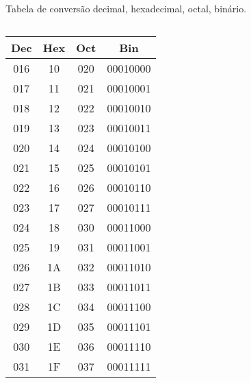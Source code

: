 \begin{frame}{Tabela de conversão decimal, hexadecimal, octal, binário.}
\begin{columns}
  \begin{column}{.5\textwidth}
    \begin{tabular}{cccc}\hline
      \bf Dec& \bf 	Hex &\bf	Oct &\bf	Bin\\\hline
      016&	10&	020&	00010000\\
      017&	11&	021&	00010001\\
      018&	12&	022&	00010010\\
      019&	13&	023&	00010011\\
      020&	14&	024&	00010100\\
      021&	15&	025&	00010101\\
      022&	16&	026&	00010110\\
      023&	17&	027&	00010111\\
      024&	18&	030&	00011000\\
      025&	19&	031&	00011001\\
      026&	1A&	032&	00011010\\
      027&	1B&	033&	00011011\\
      028&	1C&	034&	00011100\\
      029&	1D&	035&	00011101\\
      030&	1E&	036&	00011110\\
      031&	1F&	037&	00011111\\\hline
    \end{tabular}
  \end{column}
\end{columns}
\end{frame}
